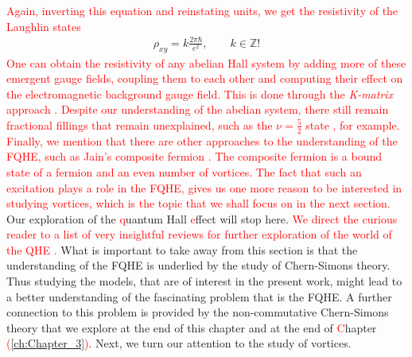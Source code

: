  \textcolor{red}{Again, inverting this equation and reinstating units, we get the resistivity of the Laughlin states}
\begin{align}
    \rho_{xy} =k\frac{2\pi \hbar}{e^2 }, \qquad k \in \mathbb{Z}!
\end{align}
 \textcolor{red}{One can obtain the resistivity of any abelian Hall system by adding more of these emergent gauge fields, coupling them to each other and computing their effect on the electromagnetic background gauge field. This is done through the \textit{K-matrix} approach \cite{PhysRevB.46.2290}. Despite our understanding of the abelian system, there still remain fractional fillings that remain unexplained, such as the $\nu=\frac{5}{2}$ state \cite{Willett:1987zz}, for example. Finally, we mention that there are other approaches to the understanding of the FQHE, such as Jain's composite fermion \cite{PhysRevLett.63.199}. The composite fermion is a bound state of a fermion and an even number of vortices. The fact that such an excitation plays a role in the FQHE, gives us one more reason to be interested in studying vortices, which is the topic that we shall focus on in the next section.}\\
        \indent Our exploration of the \textcolor{red}{q}uantum Hall \textcolor{red}{e}ffect will stop here. \textcolor{red}{We direct the curious reader to a list of very insightful reviews for further exploration of the world of the QHE \cite{Wen:1995qn, Tong:2016kpv, Zee, yoshioka2002the, Girvin}.} What is important to take away from this section is that the understanding of the FQHE is underlied by the study of Chern-Simons theory. Thus studying the models, that are of interest in the present work, might lead to a better understanding of the fascinating problem that is the FQHE. A further connection to this problem is provided by the non-commutative Chern-Simons theory that we explore at the end of this chapter and at the end of \textcolor{red}{C}hapter \textcolor{red}{(\ref{ch:Chapter_3})}. Next, we turn our attention to the study of vortices.

